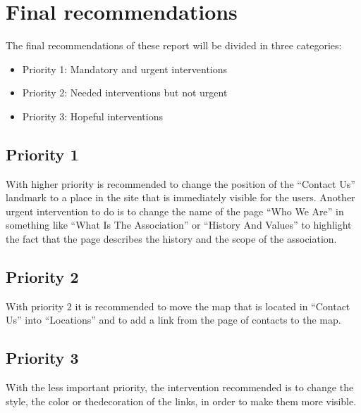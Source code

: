 \section{Final recommendations}
The final recommendations of these report will be divided in three categories:
\begin{itemize}
\item Priority 1: Mandatory and urgent interventions
\item Priority 2: Needed interventions but not urgent
\item Priority 3: Hopeful interventions
\end{itemize}

\subsection{Priority 1}
With higher priority is recommended to change the position of the ``Contact Us'' landmark to a place in the site that is immediately visible for the users. Another urgent intervention to do is to change the name of the page ``Who We Are'' in something like ``What Is The Association'' or ``History And Values'' to highlight the fact that the page describes the history and the scope of the association.

\subsection{Priority 2}
With priority 2 it is recommended to move the map that is located in ``Contact Us'' into ``Locations'' and to add a link from the page of contacts to the map.

\subsection{Priority 3}
With the less important priority, the intervention recommended is to change the style, the color or thedecoration of the links, in order to make them more visible. 
%
